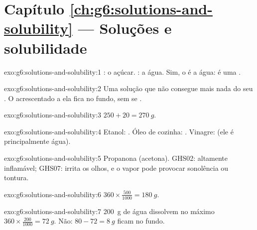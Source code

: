 \section*{Capítulo \ref{ch:g6:solutions-and-solubility} --- Soluções e solubilidade}

\begin{solution}{exo:g6:solutions-and-solubility:1}
: o açúcar. : a água. Sim, o  é a água: é uma
.
\end{solution}

\begin{solution}{exo:g6:solutions-and-solubility:2}
Uma solução que não consegue  mais nada do seu . O 
acrescentado a ela fica no fundo, sem se .
\end{solution}

\begin{solution}{exo:g6:solutions-and-solubility:3}
$250 + 20 = \qty{270}{g}$.
\end{solution}

\begin{solution}{exo:g6:solutions-and-solubility:4}
Etanol: . Óleo de cozinha: . Vinagre:  (ele é
principalmente água).
\end{solution}

\begin{solution}{exo:g6:solutions-and-solubility:5}
Propanona (acetona). GHS02: altamente inflamável; GHS07: irrita os
olhos, e o vapor pode provocar sonolência ou tontura.
\end{solution}

\begin{solution}{exo:g6:solutions-and-solubility:6}
$360 \times \frac{500}{1000} = \qty{180}{g}$.
\end{solution}

\begin{solution}{exo:g6:solutions-and-solubility:7}
\qty{200}{g} de água dissolvem no máximo $360 \times \frac{200}{1000} =
\qty{72}{g}$. Não: $80 - 72 = \qty{8}{g}$ ficam no fundo.
\end{solution}

